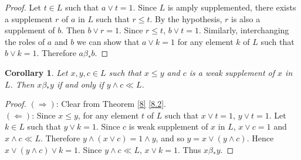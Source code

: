 \documentclass[11pt,reqno]{amsart} %
\theoremstyle{plain}
\newtheorem{corollary}{Corollary}
\theoremstyle{definition}
\theoremstyle{remark}
\numberwithin{equation}{section}
\begin{document}
\begin{proof}
  Let $ t \in L $ such that $ a \vee t = 1 $. Since $ L $ is amply supplemented, there exists 
  a supplement $ r $ of $ a $ in $ L $ such that $ r \leq t $. By the hypothesis, 
  $ r $ is also a supplement of $ b $. Then $ b \vee r = 1 $. Since $ r \leq t $, $ b \vee t = 1 $. 
  Similarly, interchanging the roles of $ a $ and $ b $ we can show that $ a \vee k = 1 $ for any 
  element $ k $ of $ L $ such that $ b \vee k = 1 $. Therefore $ a \beta_* b $.
\end{proof}

\begin{corollary}\label{10}
  Let $ x,y,c \in L $ such that $ x \leq y $ and $ c $ is a weak supplement of $ x $ in $ L $. Then 
  $ x \beta_* y $ if and only if $ y \wedge c \ll L $.
\end{corollary}

\begin{proof}
  $ ( \Rightarrow ) $: 
  Clear from Theorem \ref{8} \ref{8.2}. \\
  $ ( \Leftarrow ) $:  
  Since $ x \leq y $, for any element $ t $ of $ L $ such that $ x \vee t = 1 $, $ y \vee t = 1 $. 
  Let $ k \in L $ such that $ y \vee k = 1 $. Since $ c $ is weak supplement of $ x $ in $ L $, 
  $ x \vee c = 1 $ and $ x \wedge c \ll L $. Therefore $ y \wedge ( x \vee c ) = 1 \wedge y $, and so 
  $ y = x \vee ( y \wedge c ) $. Hence $ x \vee ( y \wedge c ) \vee k = 1 $. Since $ y \wedge c \ll L $, 
  $ x \vee k = 1 $. Thus $ x \beta_* y $.
\end{proof}

\end{document}
